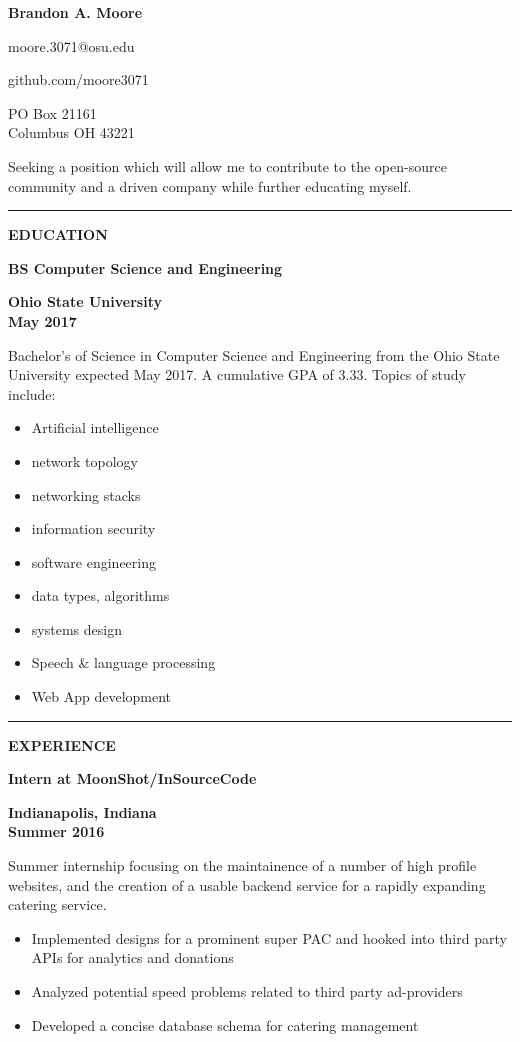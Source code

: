 \documentclass[letterpaper,10pt]{article}
\newcommand{\topic}[1]{\vspace{2mm} \rule[.5em]{10mm}{.2pt} {\large \bfseries #1} \xrfill[.5em]{.2pt} \newline}
\newcommand{\fullentry}[3] { \parbox[t]{.6\textwidth}{\large \bfseries #1} \hfill \parbox[t]{.4\textwidth}{\bfseries \raggedleft #2 \\ #3} \vspace{.5mm} \newline}
\newcommand{\contact}[1]{\parbox{.2\textwidth}{\centering #1}}
\begin{document}
	\begin{center} \huge \bfseries
		Brandon A. Moore
	\end{center}
	\contact{moore.3071@osu.edu} \hfill \contact{github.com/moore3071} \hfill \contact{PO Box 21161\\ Columbus OH 43221}


	\vspace{5mm}

	 Seeking a position which will allow me to contribute to the open-source community and a driven company while further educating myself.

	\vspace{3mm}

	\topic{EDUCATION}

		\fullentry{BS Computer Science and Engineering}{Ohio State University}{May 2017}
			Bachelor's of Science in Computer Science and Engineering from the Ohio State University expected May 2017. A cumulative GPA of 3.33. Topics of study include:
			\begin{multicols}{3}
				\begin{itemize}
					\setlength\itemsep{.1mm}
					\item Artificial intelligence
					\item network topology
					\item networking stacks
					\item information security
					\item software engineering
					\item data types, algorithms
					\item systems design
					\item Speech \& language processing
					\item Web App development
				\end{itemize}
			\end{multicols}

	\topic{EXPERIENCE}

		\fullentry{Intern at MoonShot/InSourceCode}{Indianapolis, Indiana}{Summer 2016}
			Summer internship focusing on the maintainence of a number of high profile websites, and the creation of a usable backend service for a rapidly expanding catering service.
			\begin{itemize}
				\item Implemented designs for a prominent super PAC and hooked into third party APIs for analytics and donations
				\item Analyzed potential speed problems related to third party ad-providers
				\item Developed a concise database schema for catering management
			\end{itemize}
\end{document}
